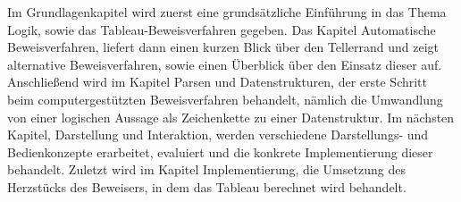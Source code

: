 Im Grundlagenkapitel wird zuerst eine grundsätzliche Einführung in das Thema Logik, sowie das Tableau-Beweisverfahren gegeben. Das Kapitel Automatische Beweisverfahren, liefert dann einen kurzen Blick über den Tellerrand und zeigt alternative Beweisverfahren, sowie einen Überblick über den Einsatz dieser auf. Anschließend wird im Kapitel Parsen und Datenstrukturen, der erste Schritt beim computergestützten Beweisverfahren behandelt, nämlich die Umwandlung von einer logischen Aussage als Zeichenkette zu einer Datenstruktur. Im nächsten Kapitel, Darstellung und Interaktion, werden verschiedene Darstellungs- und Bedienkonzepte erarbeitet, evaluiert und die konkrete Implementierung dieser behandelt. Zuletzt wird im Kapitel Implementierung, die Umsetzung des Herzstücks des Beweisers, in dem das Tableau berechnet wird behandelt.



